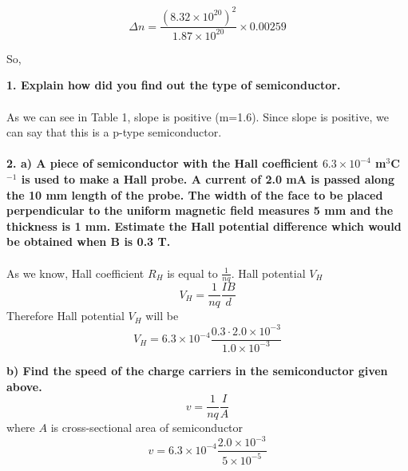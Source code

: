 \documentclass[a4paper,12pt]{article}
\begin{document}
\begin{equation}
\Delta n = \frac{(8.32\times 10^{20})^{2}}{1.87\times 10^{20}}\times 0.00259
\end{equation}
\begin{center}
\end{center}
So,
\begin{center}
\end{center}
\textbf{1. Explain how did you find out the type of semiconductor.}\\\\
As we can see in Table 1, slope is positive (m=1.6). Since slope is positive, we can say that this is a p-type semiconductor.\\\\
\textbf{2. a) A piece of semiconductor with the Hall coefficient $6.3\times 10^{-4}$ m$^{3}$C$^{-1}$ is used to make a Hall probe. A current of 2.0 mA is passed along the 10 mm length of the probe. The width of the face to be placed perpendicular to the uniform magnetic field measures 5 mm and the thickness is 1 mm. Estimate the Hall potential difference which would be obtained when B is 0.3 T.}\\\\
As we know, Hall coefficient $R_{H}$ is equal to $\frac{1}{nq}$. Hall potential $V_{H}$
\begin{equation}
V_{H}=\frac{1}{nq}\frac{IB}{d}
\end{equation}
Therefore Hall potential $V_{H}$ will be
\begin{equation}
V_{H}=6.3\times 10^{-4} \frac{0.3 \cdot 2.0\times 10^{-3}}{1.0 \times 10^{-3}}
\end{equation}
\begin{center}
\end{center}
\textbf{b) Find the speed of the charge carriers in the semiconductor given above.}
\begin{equation}
v=\frac{1}{nq}\frac{I}{A}
\end{equation}
where $A$ is cross-sectional area of semiconductor
\begin{equation}
v=6.3 \times 10^{-4} \frac{2.0\times 10^{-3}}{5\times 10^{-5}}
\end{equation}
\begin{center}
\end{center}
\newpage
\end{document}
